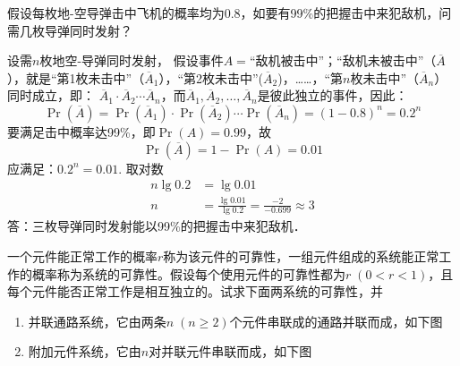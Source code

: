 \begin{example}
   假设每枚地-空导弹击中飞机的概率均为0.8，如要有99\%的把握击中来犯敌机，问需几枚导弹同时发射？ 
\end{example}


\begin{solution}
设需$n$枚地空-导弹同时发射，
假设事件$A=$“敌机被击中”；“敌机未被击中”（$\overline{A}$），就是“第1枚未击中”（$\overline{A}_1$），“第2枚未击中”($\overline{A}_2$)，……，“第$n$枚未击中”（$\overline{A}_n$）同时成立，即：
$\overline{A}_1\cdot \overline{A}_2\cdots \overline{A}_n$，而$\overline{A}_1, \overline{A}_2,\ldots,\overline{A}_n$是彼此独立的事件，因此：
\[\Pr(\overline{A})=\Pr(\overline{A}_1)\cdot \Pr(\overline{A}_2)\cdots\Pr(\overline{A}_n)=(1-0.8)^n=0.2^n\]
要满足击中概率达99\%，即$\Pr(A)=0.99$，故
\[\Pr(\overline{A})=1-\Pr(A)=0.01\]
应满足：$0.2^n=0.01$. 取对数
\[\begin{split}
    n\lg0.2&=\lg0.01\\
n&=\frac{\lg0.01}{\lg0.2}=\frac{-2}{-0.699}\approx 3
\end{split} \]
答：三枚导弹同时发射能以99\%的把握击中来犯敌机．    
\end{solution}

\begin{example}
    一个元件能正常工作的概率$r$称为该元件的可靠性，一组元件组成的系统能正常工作的概率称为系统的可靠性。假设每个使用元件的可靠性都为$r\; (0<r<1)$，且每个元件能否正常工作是相互独立的。试求下面两系统的可靠性，并

\begin{enumerate}[(1)]
    \item 并联通路系统，它由两条$n\; (n\ge 2)$个元件串联成的通路并联而成，如下图
    \item 附加元件系统，它由$n$对并联元件串联而成，如下图
\end{enumerate}
\end{example}

